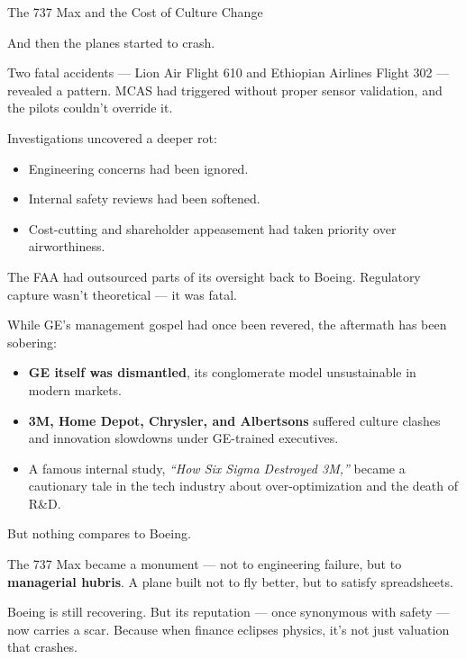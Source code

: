 \begin{HistoricalSidebar}{The 737 Max and the Cost of Culture Change}
  \medskip
  
  And then the planes started to crash.
  
  \medskip
  
  Two fatal accidents — Lion Air Flight 610 and Ethiopian Airlines Flight 302 — revealed a pattern.  
  MCAS had triggered without proper sensor validation, and the pilots couldn’t override it.
  
  \medskip
  
  Investigations uncovered a deeper rot:  

  \medskip

  \begin{itemize}
    \item Engineering concerns had been ignored.
    \item Internal safety reviews had been softened.
    \item Cost-cutting and shareholder appeasement had taken priority over airworthiness.
  \end{itemize}

  \medskip
  
  The FAA had outsourced parts of its oversight back to Boeing.  
  Regulatory capture wasn’t theoretical — it was fatal.
  
  \medskip
  
  While GE’s management gospel had once been revered, the aftermath has been sobering:
  
  \medskip

  \begin{itemize}
    \item \textbf{GE itself was dismantled}, its conglomerate model unsustainable in modern markets.
    \item \textbf{3M, Home Depot, Chrysler, and Albertsons} suffered culture clashes and innovation slowdowns under 
    GE-trained executives.
    \item A famous internal study, \textit{“How Six Sigma Destroyed 3M,”} became a cautionary tale in the tech 
    industry about over-optimization and the death of R\&D.
  \end{itemize}

  \medskip
  
  But nothing compares to Boeing.
  
  \medskip
  
  The 737 Max became a monument — not to engineering failure, but to \textbf{managerial hubris}.  
  A plane built not to fly better, but to satisfy spreadsheets.
  
  \medskip
  
  Boeing is still recovering. But its reputation — once synonymous with safety — now carries a scar.  
  Because when finance eclipses physics, it’s not just valuation that crashes.
  
\end{HistoricalSidebar}



